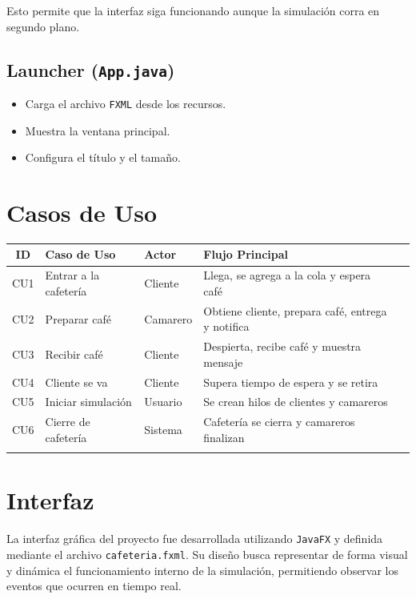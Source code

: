 \documentclass[12pt,a4paper]{article}
\begin{document}
Esto permite que la interfaz siga funcionando aunque la simulación corra en segundo plano.

\subsection{Launcher (\texttt{App.java})}

\begin{itemize}
    \item Carga el archivo \texttt{FXML} desde los recursos.
    \item Muestra la ventana principal.
    \item Configura el título y el tamaño.
\end{itemize}

\section{Casos de Uso}

\begin{longtable}{|c|l|l|l|l|}
\hline
\textbf{ID} & \textbf{Caso de Uso} & \textbf{Actor} & \textbf{Flujo Principal}  \\ \hline
CU1 & Entrar a la cafetería & Cliente & Llega, se agrega a la cola y espera café  \\ \hline
CU2 & Preparar café & Camarero & Obtiene cliente, prepara café, entrega y notifica \\ \hline
CU3 & Recibir café & Cliente & Despierta, recibe café y muestra mensaje  \\ \hline
CU4 & Cliente se va & Cliente & Supera tiempo de espera y se retira  \\ \hline
CU5 & Iniciar simulación & Usuario & Se crean hilos de clientes y camareros   \\ \hline
CU6 & Cierre de cafetería & Sistema & Cafetería se cierra y camareros finalizan \\ \hline
\label{tab:casos_uso}
\end{longtable}

\section{Interfaz}

La interfaz gráfica del proyecto fue desarrollada utilizando \texttt{JavaFX} y definida mediante el archivo \texttt{cafeteria.fxml}. Su diseño busca representar de forma visual y dinámica el funcionamiento interno de la simulación, permitiendo observar los eventos que ocurren en tiempo real.
\end{document}
